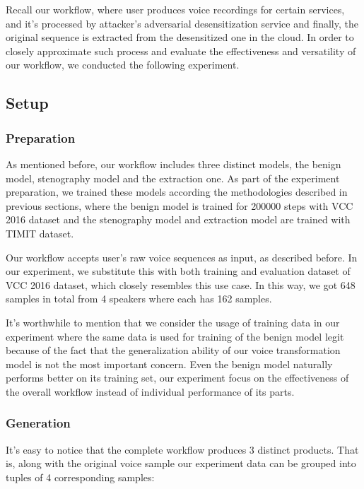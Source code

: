\documentclass[journal]{IEEEtran} %
\begin{document}
Recall our workflow, where user produces voice recordings for certain services, and it's processed by attacker's adversarial desensitization service and finally, the original sequence is extracted from the desensitized one in the cloud. In order to closely approximate such process and evaluate the effectiveness and versatility of our workflow, we conducted the following experiment.

\subsection{Setup}

\subsubsection{Preparation}

As mentioned before, our workflow includes three distinct models, the benign model, stenography model and the extraction one. As part of the experiment preparation, we trained these models according the methodologies described in previous sections, where the benign model is trained for 200000 steps with VCC 2016 dataset and the stenography model and extraction model are trained with TIMIT dataset.

Our workflow accepts user's raw voice sequences as input, as described before. In our experiment, we substitute this with both training and evaluation dataset of VCC 2016 dataset, which closely resembles this use case. In this way, we got 648 samples in total from 4 speakers where each has 162 samples.

It's worthwhile to mention that we consider the usage of training data in our experiment where the same data is used for training of the benign model legit because of the fact that the generalization ability of our voice transformation model is not the most important concern. Even the benign model naturally performs better on its training set, our experiment focus on the effectiveness of the overall workflow instead of individual performance of its parts.

\subsubsection{Generation}

It's easy to notice that the complete workflow produces 3 distinct products. That is, along with the original voice sample our experiment data can be grouped into tuples of 4 corresponding samples:
\end{document}
